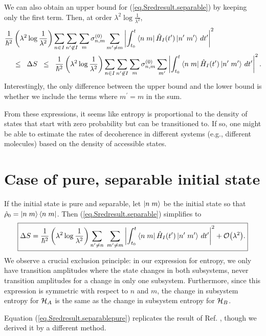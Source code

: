 We can also obtain an upper bound for (\ref{eq.Sredresult.separable}) by keeping only the first term. Then, at order \(\lambda^2 \log \frac{1}{\lambda^2}\),
\begin{align}\label{eq.dSbounds}
\frac{1}{\hbar^2}&\left(\lambda^2 \log\frac{1}{\lambda^2}\right) \sum_{n\in I}\sum_{n^\prime \not\in I} \sum_m \sigma_{n,m}^{(0)} \sum_{m^\prime \neq m} \left|\int_{t_0}^t \left\langle n\;m\right|\hat{H}_I (t^{\prime})\left|n^\prime\;m^\prime\right\rangle \,dt^{\prime}\right|^2 \\
&\leq \;\;\Delta S \;\;\leq\;\; \frac{1}{\hbar^2}\left(\lambda^2 \log\frac{1}{\lambda^2}\right) \sum_{n\in I}\sum_{n^\prime \not\in I} \sum_m \sigma_{n,m}^{(0)} \sum_{m^\prime} \left|\int_{t_0}^t \left\langle n\;m\right|\hat{H}_I (t^{\prime})\left|n^\prime\;m^\prime\right\rangle \,dt^{\prime}\right|^2. \nonumber
\end{align}
Interestingly, the only difference between the upper bound and the lower bound is whether we include the terms where \(m^\prime = m\) in the sum.

From these expressions, it seems like entropy is proportional to the density of states that start with zero probability but can be transitioned to. If so, one might be able to estimate the rates of decoherence in different systems (e.g., different molecules) based on the density of accessible states.

\section{Case of pure, separable initial state}\label{sec.purestate}

If the initial state is pure and separable, let \(\left|n\;m\right\rangle\) be the initial state so that \(\hat{\rho}_0 = \left|n\;m\right\rangle\left\langle n\;m\right|\). Then (\ref{eq.Sredresult.separable}) simplifies to
\begin{equation}\label{eq.Sredresult.separablepure}
\boxed{\Delta S =\frac{1}{\hbar^2}\left(\lambda^2 \log\frac{1}{\lambda^2}\right) \sum_{n^\prime\neq n} \;\sum_{m^\prime\neq m} \left|\int_{t_0}^t \left\langle n\;m\right| \hat{H}_I (t^{\prime})\left|n^\prime\;m^\prime\right\rangle \,dt^{\prime}\right|^2 + \mathcal{O}{\left(\lambda^2\right)}.}
\end{equation}
We observe a crucial exclusion principle: in our expression for entropy, we only have transition amplitudes where the state changes in both subsystems, never transition amplitudes for a change in only one subsystem. Furthermore, since this expression is symmetric with respect to \(n\) and \(m\), the change in subsystem entropy for \(\mathcal{H}_A\) is the same as the change in subsystem entropy for \(\mathcal{H}_B\).

Equation (\ref{eq.Sredresult.separablepure}) replicates the result of Ref. \cite{seki}, though we derived it by a different method.
